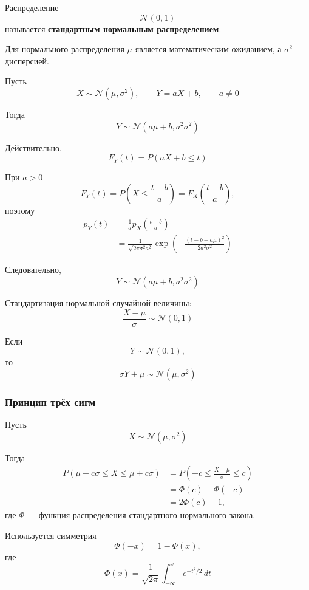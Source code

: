 \documentclass[12pt,a4paper]{article}
\begin{document}
Распределение
\[
\mathcal{N}(0,1)
\]
называется \textbf{стандартным нормальным распределением}.

\begin{note}

Для нормального распределения $\mu$
является математическим ожиданием, а $\sigma^2$ --- дисперсией.

\end{note}

Пусть
\[
X\sim\mathcal{N}(\mu,\sigma^2),
\qquad
Y=aX+b,
\qquad
a\neq0
\]

Тогда
\[
Y\sim\mathcal{N}(a\mu+b,a^2\sigma^2)
\]

Действительно,
\[
F_Y(t)
=
P(aX+b\leq t)
\]

При $a>0$
\[
F_Y(t)
=
P\left(X\leq\frac{t-b}{a}\right)
=
F_X\left(\frac{t-b}{a}\right),
\]
поэтому
\[
\begin{aligned}
p_Y(t)
&=
\frac1a
p_X\left(\frac{t-b}{a}\right)\\
&=
\frac{1}{\sqrt{2\pi\sigma^2a^2}}
\exp\left(
-\frac{(t-b-a\mu)^2}{2a^2\sigma^2}
\right)
\end{aligned}
\]

Следовательно,
\[
Y\sim\mathcal{N}(a\mu+b,a^2\sigma^2)
\]

\begin{note}

Стандартизация нормальной случайной величины:
\[
\frac{X-\mu}{\sigma}\sim\mathcal{N}(0,1)
\]

Если
\[
Y\sim\mathcal{N}(0,1),
\]
то
\[
\sigma Y+\mu\sim\mathcal{N}(\mu,\sigma^2)
\]

\end{note}

\subsubsection{Принцип трёх сигм}

Пусть
\[
X\sim\mathcal{N}(\mu,\sigma^2)
\]

Тогда
\[
\begin{aligned}
P(\mu-c\sigma\leq X\leq\mu+c\sigma)
&=
P\left(
-c\leq\frac{X-\mu}{\sigma}\leq c
\right)\\
&=
\Phi(c)-\Phi(-c)\\
&=
2\Phi(c)-1,
\end{aligned}
\]
где $\Phi$ --- функция распределения стандартного нормального закона.

Используется симметрия
\[
\Phi(-x)=1-\Phi(x),
\]
где
\[
\Phi(x)
=
\frac{1}{\sqrt{2\pi}}
\int_{-\infty}^{x}e^{-t^2/2}\,dt
\]
\end{document}
